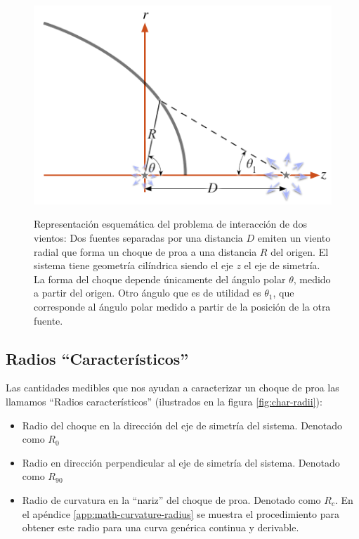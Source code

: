 \begin{figure}
  \includegraphics[width=0.5\linewidth]{./Figures/bowshock-crw-variables}
  \label{fig:crw-esquema}
  \caption{Representación esquemática del problema de interacción de dos vientos:
    Dos fuentes separadas por una distancia $D$ emiten un viento radial que forma un
    choque de proa a una distancia $R$ del origen. El sistema tiene geometría cilíndrica
    siendo el eje $z$ el eje de simetría. La forma del choque depende únicamente del ángulo
    polar $\theta$, medido a partir del origen. Otro ángulo que es de utilidad es $\theta_1$,
  que corresponde al ángulo polar medido a partir de la posición de la otra fuente.}
\end{figure}

\subsection{Radios ``Característicos''}
\label{sec:char-rad}
Las cantidades medibles que nos ayudan a caracterizar un choque de proa las
llamamos ``Radios característicos'' (ilustrados en la figura
\ref{fig:char-radii}):
\begin{itemize}
\item Radio del choque en la dirección del eje de simetría del sistema.
  Denotado como $R_0$
\item Radio en dirección perpendicular al eje de simetría del sistema.
  Denotado como $R_{90}$
\item Radio de curvatura en la ``nariz'' del choque de proa. Denotado
  como $R_c$. En el apéndice \ref{app:math-curvature-radius} se muestra
  el procedimiento para obtener este radio para una curva genérica continua
  y derivable.
\end{itemize}

